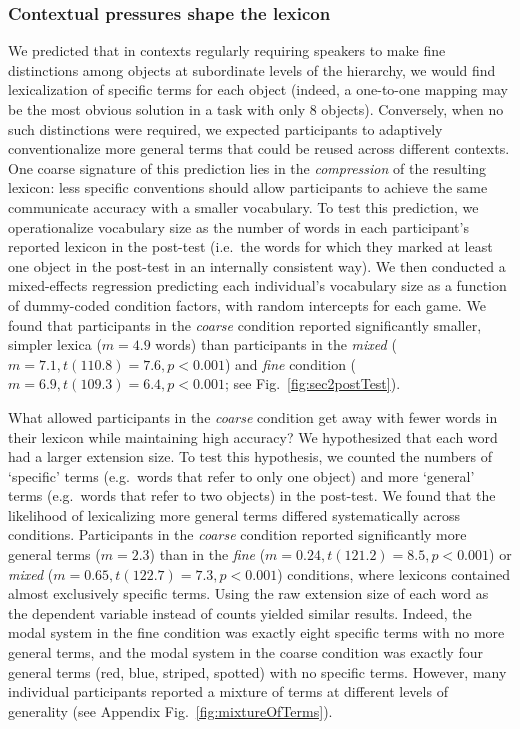 \subsubsection{Contextual pressures shape the lexicon}

We predicted that in contexts regularly requiring speakers to make fine distinctions among objects at subordinate levels of the hierarchy, we would find lexicalization of specific terms for each object (indeed, a one-to-one mapping may be the most obvious solution in a task with only 8 objects). 
Conversely, when no such distinctions were required, we expected participants to adaptively conventionalize more general terms that could be reused across different contexts.
One coarse signature of this prediction lies in the \emph{compression} of the resulting lexicon: less specific conventions should allow participants to achieve the same communicate accuracy with a smaller vocabulary.
To test this prediction, we operationalize vocabulary size as the number of words in each participant's reported lexicon in the post-test (i.e.\ the words for which they marked at least one object in the post-test in an internally consistent way). 
We then conducted a mixed-effects regression predicting each individual's vocabulary size as a function of dummy-coded condition factors, with random intercepts for each game. 
We found that participants in the \emph{coarse} condition reported significantly smaller, simpler lexica ($m = 4.9$ words) than participants in the \emph{mixed} ($m=7.1, t(110.8)=7.6, p < 0.001$) and \emph{fine} condition ($m = 6.9, t(109.3) = 6.4, p < 0.001$; see Fig.~\ref{fig:sec2postTest}). 

What allowed participants in the \emph{coarse} condition get away with fewer words in their lexicon while maintaining high accuracy?
We hypothesized that each word had a larger extension size. 
To test this hypothesis, we counted the numbers of `specific' terms (e.g.~words that refer to only one object) and more `general' terms (e.g.~words that refer to two objects) in the post-test. 
We found that the likelihood of lexicalizing more general terms differed systematically across conditions.
Participants in the \emph{coarse} condition reported significantly more general terms ($m=2.3$) than in the \emph{fine} ($m = 0.24, t(121.2) = 8.5, p < 0.001$) or \emph{mixed} ($m=0.65, t(122.7)= 7.3, p < 0.001$) conditions, where lexicons contained almost exclusively specific terms.
Using the raw extension size of each word as the dependent variable instead of counts yielded similar results.
Indeed, the modal system in the fine condition was exactly eight specific terms with no more general terms, and the modal system in the coarse condition was exactly four general terms (red, blue, striped, spotted) with no specific terms.
However, many individual participants reported a mixture of terms at different levels of generality (see Appendix Fig.~\ref{fig:mixtureOfTerms}). 

